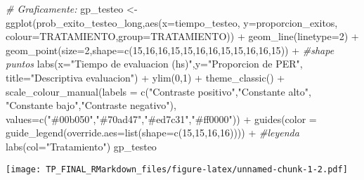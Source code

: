 \documentclass[
]{article}
\newenvironment{Shaded}{\begin{snugshade}}{\end{snugshade}}
\newcommand{\AttributeTok}[1]{\textcolor[rgb]{0.77,0.63,0.00}{#1}}
\newcommand{\CommentTok}[1]{\textcolor[rgb]{0.56,0.35,0.01}{\textit{#1}}}
\newcommand{\DecValTok}[1]{\textcolor[rgb]{0.00,0.00,0.81}{#1}}
\newcommand{\FunctionTok}[1]{\textcolor[rgb]{0.00,0.00,0.00}{#1}}
\newcommand{\NormalTok}[1]{#1}
\newcommand{\OtherTok}[1]{\textcolor[rgb]{0.56,0.35,0.01}{#1}}
\newcommand{\SpecialCharTok}[1]{\textcolor[rgb]{0.00,0.00,0.00}{#1}}
\newcommand{\StringTok}[1]{\textcolor[rgb]{0.31,0.60,0.02}{#1}}
\begin{document}
\begin{Shaded}
\begin{Highlighting}[]
\CommentTok{\# Graficamente:}
\NormalTok{gp\_testeo }\OtherTok{\textless{}{-}} \FunctionTok{ggplot}\NormalTok{(prob\_exito\_testeo\_long,}\FunctionTok{aes}\NormalTok{(}\AttributeTok{x=}\NormalTok{tiempo\_testeo, }\AttributeTok{y=}\NormalTok{proporcion\_exitos, }\AttributeTok{colour=}\NormalTok{TRATAMIENTO,}\AttributeTok{group=}\NormalTok{TRATAMIENTO)) }\SpecialCharTok{+}
  \FunctionTok{geom\_line}\NormalTok{(}\AttributeTok{linetype=}\DecValTok{2}\NormalTok{) }\SpecialCharTok{+}
  \FunctionTok{geom\_point}\NormalTok{(}\AttributeTok{size=}\DecValTok{2}\NormalTok{,}\AttributeTok{shape=}\FunctionTok{c}\NormalTok{(}\DecValTok{15}\NormalTok{,}\DecValTok{16}\NormalTok{,}\DecValTok{16}\NormalTok{,}\DecValTok{15}\NormalTok{,}\DecValTok{15}\NormalTok{,}\DecValTok{16}\NormalTok{,}\DecValTok{16}\NormalTok{,}\DecValTok{15}\NormalTok{,}\DecValTok{15}\NormalTok{,}\DecValTok{16}\NormalTok{,}\DecValTok{16}\NormalTok{,}\DecValTok{15}\NormalTok{)) }\SpecialCharTok{+} \CommentTok{\#shape puntos}
  \FunctionTok{labs}\NormalTok{(}\AttributeTok{x=}\StringTok{"Tiempo de evaluacion (hs)"}\NormalTok{,}\AttributeTok{y=}\StringTok{"Proporcion de PER"}\NormalTok{,}
       \AttributeTok{title=}\StringTok{"Descriptiva evaluacion"}\NormalTok{) }\SpecialCharTok{+}
  \FunctionTok{ylim}\NormalTok{(}\DecValTok{0}\NormalTok{,}\DecValTok{1}\NormalTok{) }\SpecialCharTok{+} \FunctionTok{theme\_classic}\NormalTok{() }\SpecialCharTok{+}
  \FunctionTok{scale\_colour\_manual}\NormalTok{(}\AttributeTok{labels =} \FunctionTok{c}\NormalTok{(}\StringTok{"Contraste positivo"}\NormalTok{,}\StringTok{"Constante alto"}\NormalTok{,}
                                 \StringTok{"Constante bajo"}\NormalTok{,}\StringTok{"Contraste negativo"}\NormalTok{),}
                      \AttributeTok{values=}\FunctionTok{c}\NormalTok{(}\StringTok{"\#00b050"}\NormalTok{,}\StringTok{"\#70ad47"}\NormalTok{,}\StringTok{"\#ed7c31"}\NormalTok{,}\StringTok{"\#ff0000"}\NormalTok{)) }\SpecialCharTok{+}
  \FunctionTok{guides}\NormalTok{(}\AttributeTok{color =} \FunctionTok{guide\_legend}\NormalTok{(}\AttributeTok{override.aes=}\FunctionTok{list}\NormalTok{(}\AttributeTok{shape=}\FunctionTok{c}\NormalTok{(}\DecValTok{15}\NormalTok{,}\DecValTok{15}\NormalTok{,}\DecValTok{16}\NormalTok{,}\DecValTok{16}\NormalTok{)))) }\SpecialCharTok{+} \CommentTok{\#leyenda}
  \FunctionTok{labs}\NormalTok{(}\AttributeTok{col=}\StringTok{"Tratamiento"}\NormalTok{)}
\NormalTok{gp\_testeo}
\end{Highlighting}
\end{Shaded}

\texttt{[image: TP\_FINAL\_RMarkdown\_files/figure-latex/unnamed-chunk-1-2.pdf]}
\end{document}
